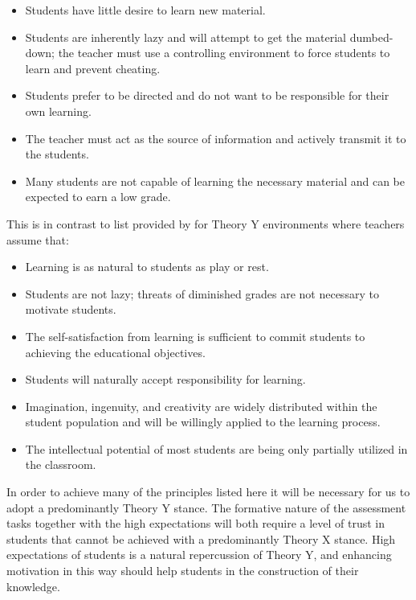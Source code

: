 \begin{itemize}
	\item Students have little desire to learn new material.
	\item Students are inherently lazy and will attempt to get the material dumbed-down; the teacher must use a controlling environment to force students to learn and prevent cheating.
	\item Students prefer to be directed and do not want to be responsible for their own learning.
	\item The teacher must act as the source of information and actively transmit it to the students.
	\item Many students are not capable of learning the necessary material and can be expected to earn a low grade.
\end{itemize}

\noindent This is in contrast to list provided by \citet{Markwell:2004} for Theory Y environments where teachers assume that:

\begin{itemize}
	\item Learning is as natural to students as play or rest.
	\item Students are not lazy; threats of diminished grades are not necessary to motivate students.
	\item The self-satisfaction from learning is sufficient to commit students to achieving the educational objectives.
	\item Students will naturally accept responsibility for learning.
	\item Imagination, ingenuity, and creativity are widely distributed within the student population and will be willingly applied to the learning process.
	\item The intellectual potential of most students are being only partially utilized in the classroom.
\end{itemize}

In order to achieve many of the principles listed here it will be necessary for us to adopt a predominantly Theory Y stance. The formative nature of the assessment tasks together with the high expectations will both require a level of trust in students that cannot be achieved with a predominantly Theory X stance. High expectations of students is a natural repercussion of Theory Y, and enhancing motivation in this way should help students in the construction of their knowledge.


